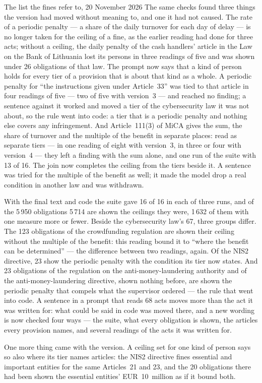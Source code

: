 \begin{lessonbox}{The list the fines refer to, 20 November 2026}
The same checks found three things the version had moved without meaning to, and one it
had not caused. The rate of a periodic penalty --- a share of the daily turnover for each
day of delay --- is no longer taken for the ceiling of a fine, as the earlier reading had
done for three acts; without a ceiling, the daily penalty of the cash handlers' article in
the Law on the Bank of Lithuania lost its persons in three readings of five and was shown
under 26 obligations of that law. The prompt now says that a kind of person holds for every
tier of a provision that is about that kind as a whole. A periodic penalty for
\enquote{the instructions given under Article~33} was tied to that article in four
readings of five --- two of five with version~3 --- and reached no finding; a sentence
against it worked and moved a tier of the cybersecurity law it was not about, so the rule
went into code: a tier that is a periodic penalty and nothing else covers any infringement.
And Article~111(3) of MiCA gives the sum, the share of turnover and the multiple of the
benefit in separate places: read as separate tiers --- in one reading of eight with
version~3, in three or four with version~4 --- they left a finding with the sum alone, and
one run of the suite with 13 of 16. The join now completes the ceiling from the tiers beside
it. A sentence was tried for the multiple of the benefit as well; it made the model drop a
real condition in another law and was withdrawn.

With the final text and code the suite gave 16 of 16 in each of three runs, and of the
5\,950 obligations 5\,714 are shown the ceilings they were, 1\,632 of them with one measure more
or fewer. Beside the cybersecurity law's 67, three groups differ. The 123 obligations of the crowdfunding regulation are shown their ceiling without the multiple of the benefit: this reading bound it to \enquote{where the benefit can be determined} --- the difference between two readings, again. Of the NIS2 directive, 23 show the periodic penalty with the condition its tier now states. And 23 obligations of the regulation on the anti-money-laundering authority and of the anti-money-laundering directive, shown nothing before, are shown the periodic penalty that compels what the supervisor ordered --- the rule that went into code. A sentence in a prompt that reads 68 acts moves more than the
act it was written for: what could be said in code was moved there, and a new wording is
now checked four ways --- the suite, what every obligation is shown, the articles every
provision names, and several readings of the acts it was written for.

One more thing came with the version. A ceiling set for one kind of person says so also
where its tier names articles: the NIS2 directive fines essential and important entities for
the same Articles~21 and 23, and the 20 obligations there had been shown the essential
entities' EUR~10~million as if it bound both.
\end{lessonbox}


